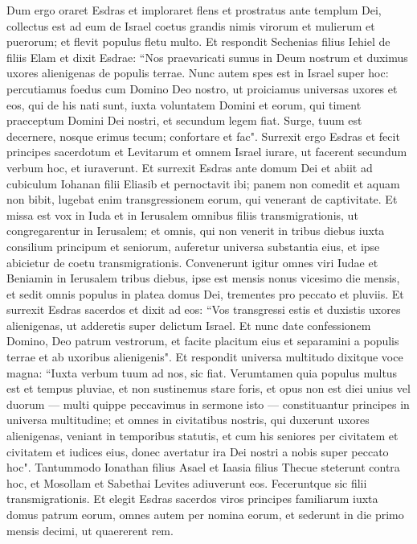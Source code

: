\begin{biblechapter}  
\verse Dum ergo oraret Esdras et imploraret flens et prostratus ante templum Dei, collectus est ad eum de Israel coetus grandis nimis virorum et mulierum et puerorum; et flevit populus fletu multo. 
\verse Et respondit Sechenias filius Iehiel de filiis Elam et dixit Esdrae: “Nos praevaricati sumus in Deum nostrum et duximus uxores alienigenas de populis terrae. Nunc autem spes est in Israel super hoc: 
\verse percutiamus foedus cum Domino Deo nostro, ut proiciamus universas uxores et eos, qui de his nati sunt, iuxta voluntatem Domini et eorum, qui timent praeceptum Domini Dei nostri, et secundum legem fiat. 
\verse Surge, tuum est decernere, nosque erimus tecum; confortare et fac". 
\verse Surrexit ergo Esdras et fecit principes sacerdotum et Levitarum et omnem Israel iurare, ut facerent secundum verbum hoc, et iuraverunt. 
\verse Et surrexit Esdras ante domum Dei et abiit ad cubiculum Iohanan filii Eliasib et pernoctavit ibi; panem non comedit et aquam non bibit, lugebat enim transgressionem eorum, qui venerant de captivitate. 
\verse Et missa est vox in Iuda et in Ierusalem omnibus filiis transmigrationis, ut congregarentur in Ierusalem; 
\verse et omnis, qui non venerit in tribus diebus iuxta consilium principum et seniorum, auferetur universa substantia eius, et ipse abicietur de coetu transmigrationis. 
\verse Convenerunt igitur omnes viri Iudae et Beniamin in Ierusalem tribus diebus, ipse est mensis nonus vicesimo die mensis, et sedit omnis populus in platea domus Dei, trementes pro peccato et pluviis. 
\verse Et surrexit Esdras sacerdos et dixit ad eos: “Vos transgressi estis et duxistis uxores alienigenas, ut adderetis super delictum Israel. 
\verse Et nunc date confessionem Domino, Deo patrum vestrorum, et facite placitum eius et separamini a populis terrae et ab uxoribus alienigenis". 
\verse Et respondit universa multitudo dixitque voce magna: “Iuxta verbum tuum ad nos, sic fiat. 
\verse Verumtamen quia populus multus est et tempus pluviae, et non sustinemus stare foris, et opus non est diei unius vel duorum — multi quippe peccavimus in sermone isto — 
\verse constituantur principes in universa multitudine; et omnes in civitatibus nostris, qui duxerunt uxores alienigenas, veniant in temporibus statutis, et cum his seniores per civitatem et civitatem et iudices eius, donec avertatur ira Dei nostri a nobis super peccato hoc". 
\verse Tantummodo Ionathan filius Asael et Iaasia filius Thecue steterunt contra hoc, et Mosollam et Sabethai Levites adiuverunt eos. 
\verse Feceruntque sic filii transmigrationis. Et elegit Esdras sacerdos viros principes familiarum iuxta domus patrum eorum, omnes autem per nomina eorum, et sederunt in die primo mensis decimi, ut quaererent rem. 

\end{biblechapter}

